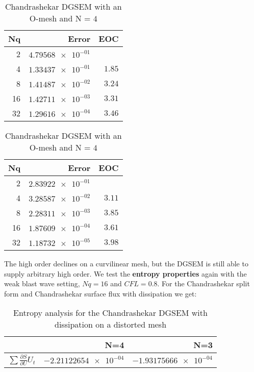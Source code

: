 \documentclass[11pt]{scrartcl}
\begin{document}
\begin{table}[H]
\parbox{.45\linewidth}{
\centering
    \begin{tabular}{|r|r|r|}
    \hline\hline
    \textbf{Nq} & \textbf{Error} & \textbf{EOC} \\\hline
    2 & $\num{4.79568e-01}$ &  \\
    4 & $\num{1.33437e-01}$ & $\num{1.85}$ \\
    8 & $\num{1.41487e-02}$ & $\num{3.24}$ \\
    16 & $\num{1.42711e-03}$ & $\num{3.31}$ \\
    32 & $\num{1.29616e-04}$ & $\num{3.46}$ \\\hline\hline
  \end{tabular} 
  \caption{Chandrashekar DGSEM with an O-mesh and N = $3$}
  }
  \hspace{0.5cm}
  \parbox{.45\linewidth}{
	\centering
    \begin{tabular}{|r|r|r|}
    \hline\hline
    \textbf{Nq} & \textbf{Error} & \textbf{EOC} \\\hline
    2 & $\num{2.83922e-01}$ &  \\
    4 & $\num{3.28587e-02}$ & $\num{3.11}$ \\
    8 & $\num{2.28311e-03}$ & $\num{3.85}$ \\
    16 & $\num{1.87609e-04}$ & $\num{3.61}$ \\
    32 & $\num{1.18732e-05}$ & $\num{3.98}$ \\\hline\hline
  \end{tabular}
   \caption{Chandrashekar DGSEM with an O-mesh and N = $4$}
  }
\end{table}
The high order declines on a curvilinear mesh, but the DGSEM is still able to supply arbitrary high order. We test the \textbf{entropy properties} again with the weak blast wave setting, $Nq = 16$ and $CFL=0.8$. For the Chandrashekar split form and Chandrashekar surface flux with dissipation we get: \\
\begin{table}[H]
\centering
\begin{tabular}{|r|r|r|}
    \hline\hline
     & \textbf{N=4} & \textbf{N=3} \\\hline
    $\sum \frac{\partial S}{\partial U} U_t$ & $\num{-2.21122654e-04}$ & $\num{-1.93175666e-04}$ \\\hline\hline
\end{tabular}
\caption{Entropy analysis for the Chandrashekar DGSEM with dissipation on a distorted mesh}
\end{table}
\end{document}
